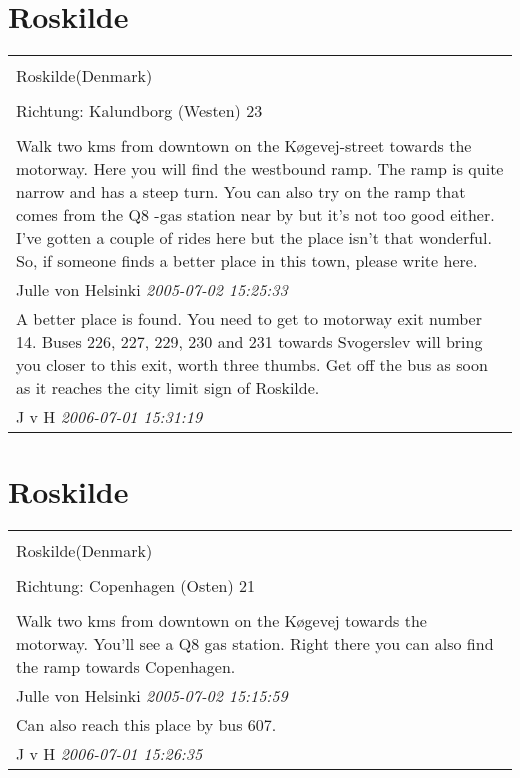 \documentclass[a4paper,12pt]{article}
\begin{document}
\section{Roskilde}
\begin{tabular}{|p{13cm}|}
\hline\\
Roskilde(Denmark)\\
\\
Richtung: Kalundborg (Westen) 23 \\
\hline\\
Walk two kms from downtown on the Køgevej-street towards the motorway. Here you will find the westbound ramp. The ramp is quite narrow and has a steep turn. You can also try on the ramp that comes from the Q8 -gas station near by but it's not too good either. I've gotten a couple of rides here but the place isn't that wonderful. So, if someone finds a better place in this town, please write here. \\
Julle von Helsinki \textit{ 2005-07-02 15:25:33 }\\\hline A better place is found. You need to get to motorway exit number 14. Buses 226, 227, 229, 230 and 231 towards Svogerslev will bring you closer to this exit, worth three thumbs. Get off the bus as soon as it reaches the city limit sign of Roskilde. \\
J v H \textit{ 2006-07-01 15:31:19 }\\\hline
\end{tabular}


\section{Roskilde}
\begin{tabular}{|p{13cm}|}
\hline\\
Roskilde(Denmark)\\
\\
Richtung: Copenhagen (Osten) 21 \\
\hline\\
Walk two kms from downtown on the Køgevej towards the motorway. You'll see a Q8 gas station. Right there you can also find the ramp towards Copenhagen. \\
Julle von Helsinki \textit{ 2005-07-02 15:15:59 }\\\hline Can also reach this place by bus 607. \\
J v H \textit{ 2006-07-01 15:26:35 }\\\hline
\end{tabular}
\end{document}
